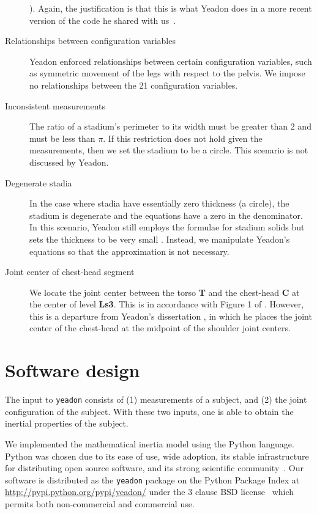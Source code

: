 \documentclass[10pt]{article}
\begin{document}
\begin{description}
        \cite{Yeadon1984a}). Again, the justification is that this is what
        Yeadon does in a more recent version of the code he shared with
        us~\cite{Yeadon2011}.
    \item[Relationships between configuration variables] Yeadon enforced
        relationships between certain configuration variables, such as
        symmetric movement of the legs with respect to the pelvis. We impose no
        relationships between the 21 configuration variables.
    \item[Inconsistent measurements] The ratio of a stadium's perimeter to its
        width must be greater than 2 and must be less than $\pi$. If this
        restriction does not hold given the measurements, then we set the
        stadium to be a circle. This scenario is not discussed by Yeadon.
    \item[Degenerate stadia] In the case where stadia have essentially zero
        thickness (a circle), the stadium is degenerate and the equations have
        a zero in the denominator. In this scenario, Yeadon still employs the
        formulae for stadium solids but sets the thickness to be very small
        \cite{Yeadon1990f}.  Instead, we manipulate Yeadon's equations so that
        the approximation is not necessary.
    \item[Joint center of chest-head segment] We locate the joint center
        between the torso \textbf{T} and the chest-head \textbf{C} at the
        center of level \textbf{Ls3}. This is in accordance with Figure 1 of
        \cite{Yeadon1990e}. However, this is a departure from Yeadon's
        dissertation \cite{Yeadon1984a}, in which he places the joint center of
        the chest-head at the midpoint of the shoulder joint centers.
\end{description}

\section*{Software design}

The input to \verb+yeadon+ consists of (1) measurements of a subject, and (2)
the joint configuration of the subject. With these two inputs, one is able to
obtain the inertial properties of the subject.

We implemented the mathematical inertia model using the Python language.
Python was chosen due to its ease of use, wide adoption, its stable
infrastructure for distributing open source software, and its strong scientific
community~\cite{SciPy2014}. Our software is distributed as the \verb+yeadon+
package on the Python Package Index at
\url{http://pypi.python.org/pypi/yeadon/} under the 3 clause BSD
license~\cite{BSD2014} which permits both non-commercial and commercial use.
\end{document}
